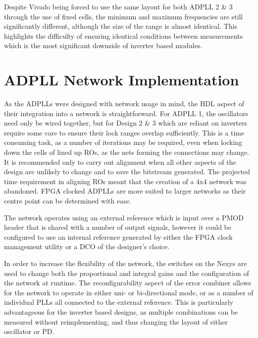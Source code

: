 Despite Vivado being forced to use the same layout for both \ac{ADPLL} 2 \& 3 through the use of fixed cells, the minimum and maximum frequencies are still significantly different, although the size of the range is almost identical. This highlights the difficulty of ensuring identical conditions between measurements which is the most significant downside of inverter based modules. 


\section{\acs{ADPLL} Network Implementation}
As the \ac{ADPLL}s were designed with network usage in mind, the \ac{HDL} aspect of their integration into a network is straightforward. For \ac{ADPLL} 1, the oscillators need only be wired together, but for Design 2 \& 3 which are reliant on inverters require some care to ensure their lock ranges overlap sufficiently. This is a time consuming task, as a number of iterations may be required, even when locking down the cells of lined up \ac{RO}s, as the nets forming the connections may change. It is recommended only to carry out alignment when all other aspects of the design are unlikely to change and to save the bitstream generated. The projected time requirement in aligning \ac{RO}s meant that the creation of a 4x4 network was abandoned. \ac{FPGA} clocked \ac{ADPLL}s are more suited to larger networks as their centre point can be determined with ease.

The network operates using an external reference which is input over a \ac{PMOD} header that is shared with a number of output signals, however it could be configured to use an internal reference generated by either the \ac{FPGA} clock management utility or a \ac{DCO} of the designer's choice. 

In order to increase the flexibility of the network, the switches on the \acs*{Nexys} are used to change both the proportional and integral gains and the configuration of the network at runtime. The reconfigurability aspect of the error combiner allows for the network to operate in either uni- or bi-directional mode, or as a number of individual \ac{PLL}s all connected to the external reference. This is particularly advantageous for the inverter based designs, as multiple combinations can be measured without reimplementing, and thus changing the layout of either oscillator or \acl{PD}.

